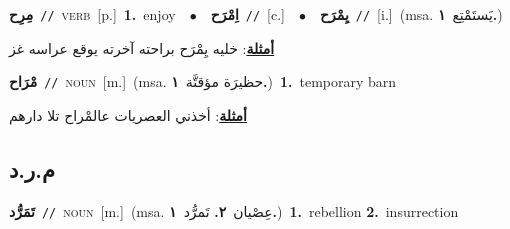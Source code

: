 \documentclass[10pt,a4paper,twoside]{article} %
\begin{document}
\begin{multicols}{2}
{\setlength\topsep{0pt}\textbf{\foreignlanguage{arabic}{مِرِح}}\ {\color{gray}\texttt{//}\color{black}}\ \textsc{verb}\ [p.]\ \textbf{1.}~enjoy\ \ $\bullet$\ \ \setlength\topsep{0pt}\textbf{\foreignlanguage{arabic}{اِمْرَح}}\ {\color{gray}\texttt{//}\color{black}}\ [c.]\ \ $\bullet$\ \ \setlength\topsep{0pt}\textbf{\foreignlanguage{arabic}{يِمْرَح}}\ {\color{gray}\texttt{//}\color{black}}\ [i.]\ \color{gray}(msa. \foreignlanguage{arabic}{يَستَمْتِع}~\foreignlanguage{arabic}{\textbf{١.}})\color{black}\  \begin{flushright}\color{gray}\foreignlanguage{arabic}{\textbf{\underline{\foreignlanguage{arabic}{أمثلة}}}: خليه يِمْرَح براحته آخرته يوقع عراسه غز}\end{flushright}\color{black}} \vspace{2mm}

{\setlength\topsep{0pt}\textbf{\foreignlanguage{arabic}{مْرَاح}}\ {\color{gray}\texttt{//}\color{black}}\ \textsc{noun}\ [m.]\ \color{gray}(msa. \foreignlanguage{arabic}{حظيرَة مؤقتَّة}~\foreignlanguage{arabic}{\textbf{١.}})\color{black}\ \textbf{1.}~temporary barn\  \begin{flushright}\color{gray}\foreignlanguage{arabic}{\textbf{\underline{\foreignlanguage{arabic}{أمثلة}}}: أخذني العصريات عالمْراح تلا دارهم}\end{flushright}\color{black}} \vspace{2mm}

\vspace{-3mm}
\subsection*{\color{blue}\foreignlanguage{arabic}{م.ر.د}\color{blue}{}} 

{\setlength\topsep{0pt}\textbf{\foreignlanguage{arabic}{تَمَرُّد}}\ {\color{gray}\texttt{//}\color{black}}\ \textsc{noun}\ [m.]\ \color{gray}(msa. \foreignlanguage{arabic}{عِصْيان}~\foreignlanguage{arabic}{\textbf{٢.}}  \foreignlanguage{arabic}{تَمرُّد}~\foreignlanguage{arabic}{\textbf{١.}})\color{black}\ \textbf{1.}~rebellion  \textbf{2.}~insurrection\ } \vspace{2mm}


\end{multicols}
\end{document}

